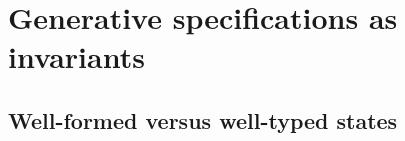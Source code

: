 \chapter{Generative specifications as invariants}
\label{chapter-gen}









\section{Well-formed versus well-typed states}

